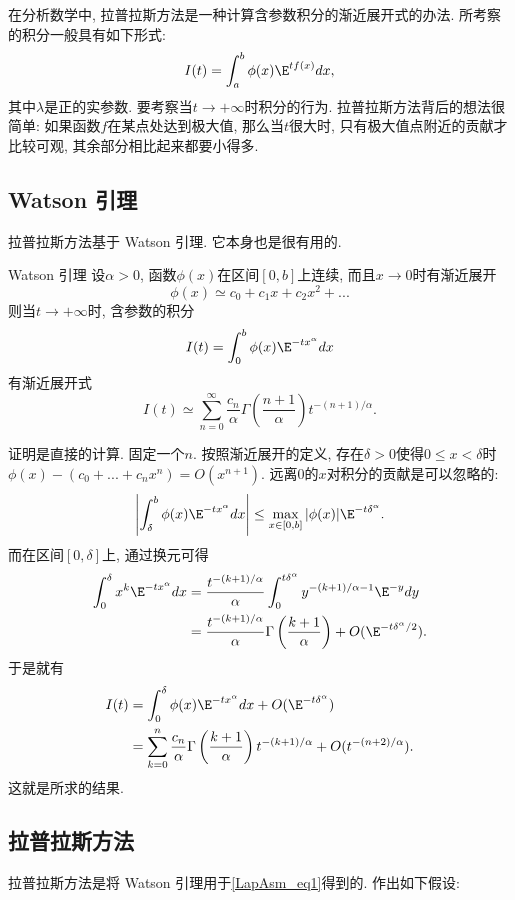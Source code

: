 

在分析数学中, 拉普拉斯方法是一种计算含参数积分的渐近展开式的办法. 所考察的积分一般具有如下形式:
\begin{equation}\label{LapAsm_eq1}
I(t)=\int_a^b \phi(x)\E^{t f(x)}dx,
\end{equation}
其中$\lambda$是正的实参数. 要考察当$t\to+\infty$时积分的行为. 拉普拉斯方法背后的想法很简单: 如果函数$f$在某点处达到极大值, 那么当$t$很大时, 只有极大值点附近的贡献才比较可观, 其余部分相比起来都要小得多.

\subsection{Watson 引理}
拉普拉斯方法基于 Watson 引理. 它本身也是很有用的.

\begin{lemma}{Watson 引理}
设$\alpha>0$, 函数$\phi(x)$在区间$[0,b]$上连续, 而且$x\to0$时有渐近展开
$$
\phi(x)\simeq c_0+c_1x+c_2x^2+...
$$
则当$t\to+\infty$时, 含参数的积分
$$
I(t)=\int_0^b \phi(x)\E^{-t x^\alpha}dx
$$
有渐近展开式
$$
I(t)\simeq\sum_{n=0}^\infty \frac{c_n}{\alpha}\Gamma\left(\frac{n+1}{\alpha}\right)t^{-(n+1)/\alpha}.
$$
\end{lemma}

证明是直接的计算. 固定一个$n$. 按照渐近展开的定义, 存在$\delta>0$使得$0\leq x<\delta$时$\phi(x)-(c_0+...+c_nx^n)=O(x^{n+1})$. 远离$0$的$x$对积分的贡献是可以忽略的:
$$
\left|\int_\delta^b\phi(x)\E^{-tx^\alpha}dx\right|
\leq\max_{x\in[0,b]}|\phi(x)|\E^{-t\delta^\alpha}.
$$
而在区间$[0,\delta]$上, 通过换元可得
$$
\begin{aligned}
\int_0^\delta x^k\E^{-tx^\alpha}dx
&=\frac{t^{-(k+1)/\alpha}}{\alpha}\int_0^{t\delta^\alpha}y^{-(k+1)/\alpha-1}\E^{-y}dy\\
&=\frac{t^{-(k+1)/\alpha}}{\alpha}\Gamma\left(\frac{k+1}{\alpha}\right)+O(\E^{-t\delta^\alpha/2}).
\end{aligned}
$$
于是就有
$$
\begin{aligned}
I(t)
&=\int_0^\delta\phi(x)\E^{-tx^\alpha}dx+O(\E^{-t\delta^\alpha})\\
&=\sum_{k=0}^n\frac{c_n}{\alpha}\Gamma\left(\frac{k+1}{\alpha}\right)t^{-(k+1)/\alpha}+O(t^{-(n+2)/\alpha}).
\end{aligned}
$$
这就是所求的结果.

\subsection{拉普拉斯方法}
拉普拉斯方法是将 Watson 引理用于\autoref{LapAsm_eq1}得到的. 作出如下假设:

